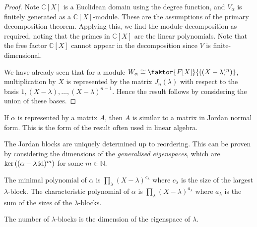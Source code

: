 \begin{proof}
	Note \( \mathbb C[X] \) is a Euclidean domain using the degree function, and \( V_\alpha \) is finitely generated as a \( \mathbb C[X] \)-module.
	These are the assumptions of the primary decomposition theorem.
	Applying this, we find the module decomposition as required, noting that the primes in \( \mathbb C[X] \) are the linear polynomials.
	Note that the free factor \( \mathbb C[X] \) cannot appear in the decomposition since \( V \) is finite-dimensional.

	We have already seen that for a module \( W_\alpha \cong \faktor{F[X]}{\qty((X-\lambda)^n)} \), multiplication by \( X \) is represented by the matrix \( J_n(\lambda) \) with respect to the basis \( 1, (X-\lambda), \dots, (X-\lambda)^{n-1} \).
	Hence the result follows by considering the union of these bases.
\end{proof}
\begin{remark}
	If \( \alpha \) is represented by a matrix \( A \), then \( A \) is similar to a matrix in Jordan normal form.
	This is the form of the result often used in linear algebra.

	The Jordan blocks are uniquely determined up to reordering.
	This can be proven by considering the dimensions of the \textit{generalised eigenspaces}, which are \( \ker\qty((\alpha - \lambda \operatorname{id})^m) \) for some \( m \in \mathbb N \).

	The minimal polynomial of \( \alpha \) is \( \prod_{\lambda} (X-\lambda)^{c_\lambda} \) where \( c_\lambda \) is the size of the largest \( \lambda \)-block.
	The characteristic polynomial of \( \alpha \) is \( \prod_{\lambda} (X-\lambda)^{a_\lambda} \) where \( a_\lambda \) is the sum of the sizes of the \( \lambda \)-blocks.

	The number of \( \lambda \)-blocks is the dimension of the eigenspace of \( \lambda \).
\end{remark}

